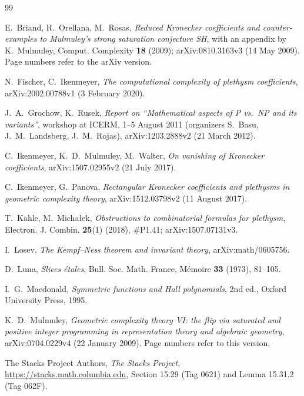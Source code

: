 \documentclass[11pt,a4paper]{article}
\theoremstyle{definition}
\begin{document}
\begin{thebibliography}{99}

E.~Briand, R.~Orellana, M.~Rosas, \emph{Reduced Kronecker coefficients and
counter-examples to Mulmuley's strong saturation conjecture SH}, with an
appendix by K.~Mulmuley, Comput. Complexity \textbf{18} (2009);
arXiv:0810.3163v3 (14 May 2009). Page numbers refer to the arXiv version.

N.~Fischer, C.~Ikenmeyer, \emph{The computational complexity of plethysm
coefficients}, arXiv:2002.00788v1 (3 February 2020).

J.~A.~Grochow, K.~Rusek, \emph{Report on ``Mathematical aspects of P vs.\ NP
and its variants''}, workshop at ICERM, 1--5 August 2011 (organizers S.~Basu,
J.~M.~Landsberg, J.~M.~Rojas), arXiv:1203.2888v2 (21 March 2012).

C.~Ikenmeyer, K.~D.~Mulmuley, M.~Walter, \emph{On vanishing of Kronecker
coefficients}, arXiv:1507.02955v2 (21 July 2017).

C.~Ikenmeyer, G.~Panova, \emph{Rectangular Kronecker coefficients and
plethysms in geometric complexity theory}, arXiv:1512.03798v2 (11 August 2017).

T.~Kahle, M.~Micha\l{}ek, \emph{Obstructions to combinatorial formulas for
plethysm}, Electron. J. Combin. \textbf{25}(1) (2018), \#P1.41;
arXiv:1507.07131v3.

I.~Losev, \emph{The Kempf--Ness theorem and invariant theory},
arXiv:math/0605756.

D.~Luna, \emph{Slices \'etales}, Bull. Soc. Math. France, M\'emoire \textbf{33}
(1973), 81--105.

I.~G.~Macdonald, \emph{Symmetric functions and Hall polynomials}, 2nd ed.,
Oxford University Press, 1995.

K.~D.~Mulmuley, \emph{Geometric complexity theory VI: the flip via saturated
and positive integer programming in representation theory and algebraic
geometry}, arXiv:0704.0229v4 (22 January 2009). Page numbers refer to this
version.

The Stacks Project Authors, \emph{The Stacks Project},
\url{https://stacks.math.columbia.edu}, Section 15.29 (Tag 0621) and
Lemma 15.31.2 (Tag 062F).

\end{thebibliography}
\end{document}

